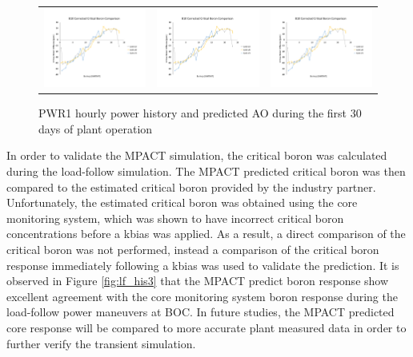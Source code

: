 \documentclass[edeposit,fullpage,11pt]{uiucthesis2009}
\begin{document}
\begin{landscape}
\begin{figure}[h]
\begin{tabular}{ccc}
\includegraphics[trim={0 2cm 0 3.1cm},clip,width=0.3\linewidth]{./Figures/corr_b.pdf} & \includegraphics[trim={0 2cm 0 3.1cm},clip,width=0.3\linewidth]{./Figures/corr_b.pdf} & \includegraphics[trim={0 2cm 0 3.1cm},clip,width=0.3\linewidth]{./Figures/corr_b.pdf}\\
\end{tabular}
\caption{PWR1 hourly power history and predicted \gls{AO} during the first 30 days of plant operation}
\label{lf_his1}
\end{figure}
\end{landscape}

In order to validate the MPACT simulation, the critical boron was calculated during the load-follow simulation. 
The MPACT predicted critical boron was then compared to the estimated critical boron provided by the industry partner.
Unfortunately, the estimated critical boron was obtained using the core monitoring system, which was shown to have incorrect critical boron concentrations before a kbias was applied. 
As a result, a direct comparison of the critical boron was not performed, instead a comparison of the critical boron response immediately following a kbias was used to validate the prediction.
It is observed in Figure \ref{fig:lf_his3} that the MPACT predict boron response show excellent agreement with the core monitoring system boron response during the load-follow power maneuvers at \gls{BOC}.
In future studies, the MPACT predicted core response will be compared to more accurate plant measured data in order to further verify the transient simulation. 
\end{document}

